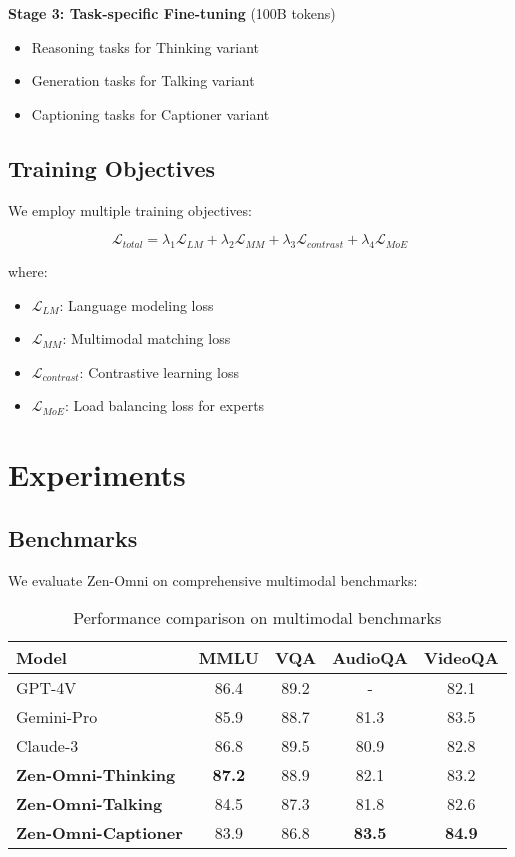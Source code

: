 \documentclass{article}
\begin{document}
\textbf{Stage 3: Task-specific Fine-tuning} (100B tokens)
\begin{itemize}
    \item Reasoning tasks for Thinking variant
    \item Generation tasks for Talking variant
    \item Captioning tasks for Captioner variant
\end{itemize}

\subsection{Training Objectives}

We employ multiple training objectives:

\begin{equation}
    \mathcal{L}_{total} = \lambda_1 \mathcal{L}_{LM} + \lambda_2 \mathcal{L}_{MM} + \lambda_3 \mathcal{L}_{contrast} + \lambda_4 \mathcal{L}_{MoE}
\end{equation}

where:
\begin{itemize}
    \item $\mathcal{L}_{LM}$: Language modeling loss
    \item $\mathcal{L}_{MM}$: Multimodal matching loss
    \item $\mathcal{L}_{contrast}$: Contrastive learning loss
    \item $\mathcal{L}_{MoE}$: Load balancing loss for experts
\end{itemize}

\section{Experiments}

\subsection{Benchmarks}

We evaluate Zen-Omni on comprehensive multimodal benchmarks:

\begin{table}[h]
\centering
\begin{tabular}{lcccc}
\toprule
\textbf{Model} & \textbf{MMLU} & \textbf{VQA} & \textbf{AudioQA} & \textbf{VideoQA} \\
\midrule
GPT-4V & 86.4 & 89.2 & - & 82.1 \\
Gemini-Pro & 85.9 & 88.7 & 81.3 & 83.5 \\
Claude-3 & 86.8 & 89.5 & 80.9 & 82.8 \\
\midrule
\textbf{Zen-Omni-Thinking} & \textbf{87.2} & 88.9 & 82.1 & 83.2 \\
\textbf{Zen-Omni-Talking} & 84.5 & 87.3 & 81.8 & 82.6 \\
\textbf{Zen-Omni-Captioner} & 83.9 & 86.8 & \textbf{83.5} & \textbf{84.9} \\
\bottomrule
\end{tabular}
\caption{Performance comparison on multimodal benchmarks}
\end{table}
\end{document}
